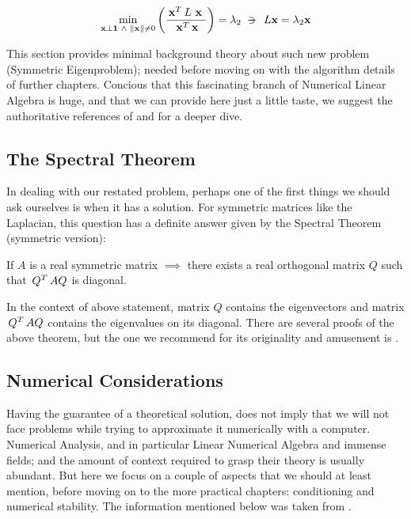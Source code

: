 \begin{equation*}
\min\limits_{\vec{x} \bot \vec{1} \ds{\land} \norm{\vec{x}} \ne 0}
\left(  
\dfrac{\trans{\vec{x}} L \ds{\vec{x}}}{\trans{\vec{x}} \vec{x}}
\right)
= \lambda_2
\suchthat{L\vec{x} = \lambda_2\vec{x}}  
\end{equation*}
\joinbelow{1cm}

This section provides minimal background theory about such new problem
(Symmetric Eigenproblem); needed before moving on with the algorithm
details of further chapters. Concious that this fascinating branch of
Numerical Linear Algebra is huge, and that we can provide here just a
little taste, we suggest the authoritative references of
\cite{parlett80} and \cite{saad92} for a deeper dive. 

\subsection{The Spectral Theorem}

In dealing with our restated problem, perhaps one of the first things
we should ask ourselves is when it has a solution. For symmetric
matrices like the Laplacian, this question has a definite answer given
by the Spectral Theorem (symmetric version):

\begin{theorem*}
If $A$ is a real symmetric matrix $\implies$ there exists a real orthogonal matrix $Q$ such that $\,{Q}^{T}\,AQ$ is diagonal. 
\end{theorem*}
\joinbelow{1cm}

In the context of above statement, matrix $Q$ contains the
eigenvectors and matrix $\,{Q}^{T}\,AQ$ contains the eigenvalues on its
diagonal. There are several proofs of the above theorem, but the one we
recommend for its originality and amusement is \cite{wilf81}.

\subsection{Numerical Considerations}

Having the guarantee of a theoretical solution, does not imply that we
will not face problems while trying to approximate it numerically with
a computer. Numerical Analysis, and in particular Linear Numerical
Algebra and immense fields; and the amount of context required to grasp
their theory is usually abundant. But here we focus on a couple of
aspects that we should at least mention, before moving on to the more
practical chapters: conditioning and numerical stability. The
information mentioned below was taken from \cite{bindel09}. \\

